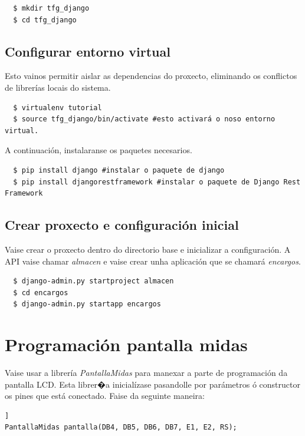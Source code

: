 \documentclass[11pt,twoside]{book}
\begin{document}
\begin{verbatim}
  $ mkdir tfg_django
  $ cd tfg_django
\end{verbatim}

\subsection{Configurar entorno virtual}

Esto vainos permitir aislar as dependencias do proxecto, eliminando os conflictos de librerías locais do sistema.
\begin{verbatim}
  $ virtualenv tutorial
  $ source tfg_django/bin/activate #esto activará o noso entorno virtual.
\end{verbatim}

A continuación, instalaranse os paquetes necesarios.

\begin{verbatim}
  $ pip install django #instalar o paquete de django
  $ pip install djangorestframework #instalar o paquete de Django Rest Framework
\end{verbatim}

\subsection{Crear proxecto e configuración inicial}

Vaise crear o proxecto dentro do directorio base e inicializar a configuración. A API vaise chamar \textit{almacen} e vaise crear unha aplicación que se chamará \textit{encargos}.

\begin{verbatim}
  $ django-admin.py startproject almacen
  $ cd encargos
  $ django-admin.py startapp encargos
\end{verbatim}

\section{Programación pantalla midas}

Vaise usar a librería \textit{PantallaMidas} para manexar a parte de programación da pantalla LCD. Esta librer�a inicialízase pasandolle por parámetros ó constructor os pines que está conectado. Faise da seguinte maneira:

\begin{lstlisting}] 
PantallaMidas pantalla(DB4, DB5, DB6, DB7, E1, E2, RS);
\end{lstlisting}
\end{document}
